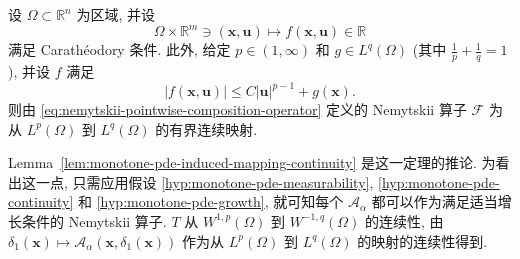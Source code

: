 \begin{Theorem}
\label{thm:nemytskii-lp-lq-bounded-continuous}
设 $\Omega\subset\mathbb{R}^n$ 为区域, 并设
\begin{equation}\label{eq:nemytskii-growth-theorem-function-domain}
\Omega\times\mathbb{R}^m\ni(\bm{x},\bm{u})\mapsto f(\bm{x},\bm{u})\in\mathbb{R}
\end{equation}
满足 Carathéodory 条件. 此外, 给定 $p\in(1,\infty)$ 和 $g\in L^q(\Omega)$ (其中 $\frac{1}{p}+\frac{1}{q}=1$), 并设 $f$ 满足
\begin{equation}\label{eq:nemytskii-growth-bound-lp-lq}
|f(\bm{x},\bm{u})|\leq C|\bm{u}|^{p-1}+g(\bm{x}).
\end{equation}
则由 \eqref{eq:nemytskii-pointwise-composition-operator} 定义的 Nemytskii 算子 $\mathcal{F}$ 为从 $L^p(\Omega)$ 到 $L^q(\Omega)$ 的有界连续映射.
\end{Theorem}

\begin{Remark}
\label{rem:nemytskii-monotone-pde-continuity-corollary}
Lemma~\ref{lem:monotone-pde-induced-mapping-continuity} 是这一定理的推论. 为看出这一点, 只需应用假设 \ref{hyp:monotone-pde-measurability}, \ref{hyp:monotone-pde-continuity} 和 \ref{hyp:monotone-pde-growth}, 就可知每个 $\mathcal{A}_\alpha$ 都可以作为满足适当增长条件的 Nemytskii 算子. $T$ 从 $W^{1,p}(\Omega)$ 到 $W^{-1,q}(\Omega)$ 的连续性, 由 $\delta_1(\bm{x})\mapsto\mathcal{A}_\alpha(\bm{x},\delta_1(\bm{x}))$ 作为从 $L^p(\Omega)$ 到 $L^q(\Omega)$ 的映射的连续性得到.
\end{Remark}
